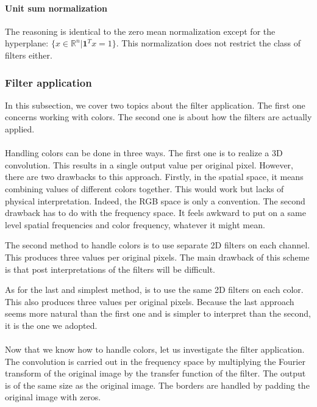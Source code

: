 \documentclass[a4paper]{report}
\begin{document}
			\paragraph{Unit sum normalization}
			The reasoning is identical to the zero mean normalization except for the hyperplane: $\{x \in \mathbb{R}^n | \textbf{1}^{T}x = 1\}$. This normalization does not restrict the class of filters either. 
			
			
			\subsubsection{Filter application}%
			In this subsection, we cover two topics about the filter application. The first one concerns working with colors. The second one is about how the filters are actually applied. 
			\paragraph{}
			Handling colors can be done in three ways. 
			The first one is to realize a 3D convolution. This results in a single output value per original pixel. However, there are two drawbacks to this approach. Firstly, in the spatial space, it means combining values of different colors together. This would work but lacks of physical interpretation. Indeed, the RGB space is only a convention. The second drawback has to do with the frequency space. It feels awkward to put on a same level spatial frequencies and color frequency, whatever it might mean.
			\par
			The second method to handle colors is to use separate 2D filters on each channel. This produces three values per original pixels. The main drawback of this scheme is that post interpretations of the filters will be difficult.
			\par
			As for the last and simplest method, is to use the same 2D filters on each color. This also produces three values per original pixels.
			Because the last approach seems more natural than the first one and is simpler to interpret than the second, it is the one we adopted.
			\paragraph{}
			Now that we know how to handle colors, let us investigate the filter application.
			The convolution is carried out in the frequency space by multiplying the Fourier transform of the original image by the transfer function of the filter. The output is of the same size as the original image. The borders are handled by padding the original image with zeros.
			
\end{document}
